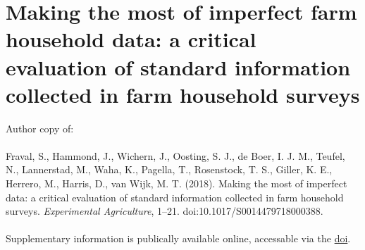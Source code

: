 \chapter[Making the most of imperfect farm household data: a critical evaluation of standard information collected in farm household surveys]{Making the most of imperfect farm household data: a critical evaluation of standard information collected in farm household surveys}
\label{cha:chapter3}
\vspace*{\fill}
Author copy of:
\\
\\
Fraval, S., Hammond, J., Wichern, J., Oosting, S. J., de Boer, I. J. M., Teufel, N., Lannerstad, M., Waha, K., Pagella, T., Rosenstock, T. S., Giller, K. E., Herrero, M., Harris, D., van Wijk, M. T. (2018). Making the most of imperfect data: a critical evaluation of standard information collected in farm household surveys. \textit{Experimental Agriculture}, 1–21. doi:10.1017/S0014479718000388.
\\
\\
Supplementary information is publically available online, accessable via the \href{https://doi.org/10.1017/S0014479718000388}{doi}.


\newpage

